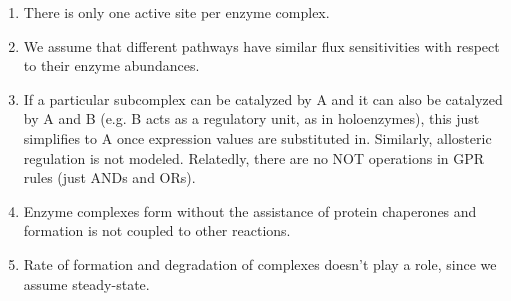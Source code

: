 

\begin{enumerate}
 {} \label{asm:expcorr}
Expression values are highly correlated with the copy numbers of their
corresponding peptide isoforms.
 {}  \label{asm:isozyme} 
Protein isoforms contributing to isozymes are considered part of the
same enzyme complex.
 {} \label{asm:hierarchy}
Any enzyme complex can be described as a hierarchical subset of
(possibly redundant) subcomplexes; redundant subcomplexes, as
elaborated in (\ref{asm:nostoich}), are not currently modeled.
 {} \label{asm:nostoich} 
Assume one copy of peptide per complex; exact isoform stoichiometry
is not considered.
 {} \label{asm:sharing} 
With the exception of complexes having identical rules (i.e. the same
complex listed for different reactions), each copy of a peptide
is available for all complexes in the model.
\item \label{asm:active_site}
There is only one active site per enzyme complex.
\item \label{asm:enzyme_sensitivity} 
We assume that different pathways have similar flux sensitivities
with respect to their enzyme abundances.
\item  \label{asm:holo} 
If a particular subcomplex can be catalyzed by A and it can also be
catalyzed by A and B (e.g. B acts as a regulatory unit, as in
holoenzymes), this just simplifies to A once expression values are
substituted in. Similarly, allosteric regulation is not
modeled. Relatedly, there are no NOT operations in GPR rules (just ANDs
and ORs).
\item \label{asm:chap} 
Enzyme complexes form without the assistance of protein chaperones and
formation is not coupled to other reactions.  
\item \label{asm:rate} 
Rate of formation and degradation of complexes doesn't play a role,
since we assume steady-state. 
\end{enumerate}
